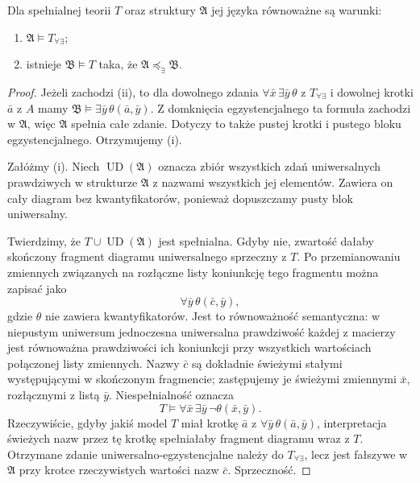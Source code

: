 \begin{lemat}
\label{lem:mod-mc-forall-exists-extension}
Dla spełnialnej teorii $T$ oraz struktury
$\mathfrak A$ jej języka równoważne są warunki:
\begin{enumerate}[label=(\roman*)]
\item $\mathfrak A\models T_{\forall\exists}$;
\item istnieje $\mathfrak B\models T$ taka, że
$\mathfrak A\preccurlyeq_{\exists}\mathfrak B$.
\end{enumerate}
\end{lemat}
\begin{proof}
Jeżeli zachodzi (ii), to dla dowolnego zdania
$\forall\bar x\,\exists\bar y\,\theta$ z
$T_{\forall\exists}$ i dowolnej krotki $\bar a$ z $A$
mamy $\mathfrak B\models\exists\bar y\,\theta(\bar a,\bar y)$.
Z domknięcia egzystencjalnego ta formuła zachodzi
w $\mathfrak A$, więc $\mathfrak A$ spełnia całe zdanie.
Dotyczy to także pustej krotki i pustego bloku
egzystencjalnego. Otrzymujemy (i).

Załóżmy (i). Niech $\operatorname{UD}(\mathfrak A)$ oznacza
zbiór wszystkich zdań uniwersalnych prawdziwych
w strukturze $\mathfrak A$ z nazwami wszystkich
jej elementów. Zawiera on cały diagram bez
kwantyfikatorów, ponieważ dopuszczamy pusty
blok uniwersalny.

Twierdzimy, że $T\cup\operatorname{UD}(\mathfrak A)$
jest spełnialna. Gdyby nie, zwartość dałaby skończony
fragment diagramu uniwersalnego sprzeczny z $T$.
Po przemianowaniu zmiennych związanych na rozłączne
listy koniunkcję tego fragmentu można zapisać jako
\[
\forall\bar y\,\theta(\bar c,\bar y),
\]
gdzie $\theta$ nie zawiera kwantyfikatorów.
Jest to równoważność semantyczna: w niepustym
uniwersum jednoczesna uniwersalna prawdziwość
każdej z macierzy jest równoważna prawdziwości
ich koniunkcji przy wszystkich wartościach
połączonej listy zmiennych.
Nazwy $\bar c$ są dokładnie świeżymi stałymi
występującymi w skończonym fragmencie; zastępujemy je
świeżymi zmiennymi $\bar x$, rozłącznymi z listą
$\bar y$. Niespełnialność oznacza
\[
T\models\forall\bar x\,\exists\bar y\,
\neg\theta(\bar x,\bar y).
\]
Rzeczywiście, gdyby jakiś model $T$ miał krotkę
$\bar a$ z $\forall\bar y\,\theta(\bar a,\bar y)$,
interpretacja świeżych nazw przez tę krotkę
spełniałaby fragment diagramu wraz z $T$.
Otrzymane zdanie uniwersalno-egzystencjalne należy
do $T_{\forall\exists}$, lecz jest fałszywe
w $\mathfrak A$ przy krotce rzeczywistych wartości
nazw $\bar c$. Sprzeczność.


\end{proof}
